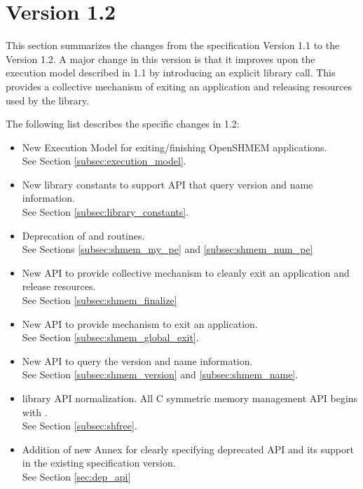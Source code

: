 \section{Version 1.2}
This section summarizes the changes from the \openshmem specification Version 1.1 to the Version 1.2.  
A major change in this version is that it improves upon the execution model described in 1.1 by introducing an explicit  library call. This provides a collective mechanism of exiting an \openshmem application and releasing resources used by the library.  



The following list describes the specific changes in 1.2:
\begin{itemize}
\item New Execution Model for exiting/finishing OpenSHMEM applications.
\\See Section  \ref{subsec:execution_model}.
\item New library constants to support API that query version and name information. 
\\See Section \ref{subsec:library_constants}.
\item Deprecation of  and  routines.
\\See Sections \ref{subsec:shmem_my_pe} and \ref{subsec:shmem_num_pe}
\item New API  to provide collective mechanism to cleanly exit an \openshmem application and release resources.
\\See Section \ref{subsec:shmem_finalize}
\item New API  to provide mechanism to exit an \openshmem application.
\\See Section \ref{subsec:shmem_global_exit}.
\item New API to query the version and name information. 
\\See Section \ref{subsec:shmem_version} and \ref{subsec:shmem_name}.
\item \openshmem library API normalization. All C symmetric memory management API begins with  .
\\See Section \ref{subsec:shfree}.
\item Addition of new Annex for clearly specifying deprecated API and its support in the existing specification version.
\\See Section \ref{sec:dep_api}

\end{itemize}
